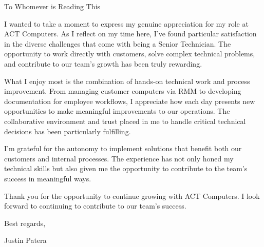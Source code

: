 
To Whomever is Reading This

\smallskip

I wanted to take a moment to express my genuine appreciation for my role at ACT Computers. As I reflect on my time here, I've found particular satisfaction in the diverse challenges that come with being a Senior Technician. The opportunity to work directly with customers, solve complex technical problems, and contribute to our team's growth has been truly rewarding.

\smallskip

What I enjoy most is the combination of hands-on technical work and process improvement. From managing customer computers via RMM to developing documentation for employee workflows, I appreciate how each day presents new opportunities to make meaningful improvements to our operations. The collaborative environment and trust placed in me to handle critical technical decisions has been particularly fulfilling.

\smallskip

I'm grateful for the autonomy to implement solutions that benefit both our customers and internal processes. The experience has not only honed my technical skills but also given me the opportunity to contribute to the team's success in meaningful ways.

\smallskip

Thank you for the opportunity to continue growing with ACT Computers. I look forward to continuing to contribute to our team's success.

\smallskip

Best regards,

Justin Patera

